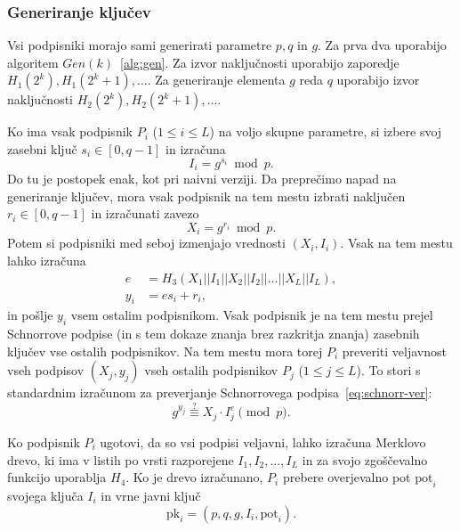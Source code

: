 \documentclass[isrm2, tisk]{fmfdelo}
\begin{document}
\subsubsection{Generiranje ključev}
Vsi podpisniki morajo sami generirati parametre $p, q$ in $g$. Za prva dva uporabijo algoritem 
$Gen(k)$~\ref{alg:gen}. Za izvor naključnosti uporabijo zaporedje $H_1(2^k), H_1(2^k + 1), \dots$.
Za generiranje elementa $g$ reda $q$ uporabijo izvor naključnosti $H_2(2^k), H_2(2^k + 1), \dots$.

Ko ima vsak podpisnik $P_i$ ($1 \le i \le L$) na voljo skupne parametre, si izbere svoj zasebni 
ključ $s_i \in [0, q - 1]$ in izračuna
$$ 
I_i = g^{s_i} \bmod p.
$$
Do tu je postopek enak, kot pri naivni verziji. Da preprečimo napad na generiranje ključev, mora 
vsak podpisnik na tem mestu izbrati naključen $r_i \in [0, q- 1]$ in izračunati zavezo
$$ 
X_i = g^{r_i} \bmod p.
$$
Potem si podpisniki med seboj izmenjajo vrednosti $(X_i, I_i)$. Vsak na tem mestu lahko izračuna
\begin{align*}
    e &= H_3(X_1 || I_1 || X_2 || I_2 || \dots || X_L || I_L), \\
    y_i &= e s_i + r_i,
\end{align*}
in pošlje $y_i$ vsem ostalim podpisnikom. Vsak podpisnik je na tem mestu prejel Schnorrove podpise
(in s tem dokaze znanja brez razkritja znanja) zasebnih ključev vse ostalih podpisnikov. Na tem mestu
mora torej $P_i$ preveriti veljavnost vseh podpisov $(X_j, y_j)$ vseh ostalih podpisnikov $P_j$ 
($1 \le j \le L$). To stori s standardnim izračunom za preverjanje Schnorrovega podpisa~\eqref{eq:schnorr-ver}: 
$$
g^{y_j} \stackrel{?}{\equiv} X_j \cdot I_j^{e} \pmod p.
$$

Ko podpisnik $P_i$ ugotovi, da so vsi podpisi veljavni, lahko izračuna Merklovo drevo, ki ima v 
listih po vrsti razporejene $I_1, I_2, \dots, I_L$ in za svojo zgoščevalno funkcijo uporablja $H_4$.
Ko je drevo izračunano, $P_i$ prebere overjevalno pot $\text{pot}_i$ svojega ključa $I_i$ in vrne 
javni ključ
$$ 
\text{pk}_i = (p, q, g, I_i, \text{pot}_i).
$$
\end{document}
